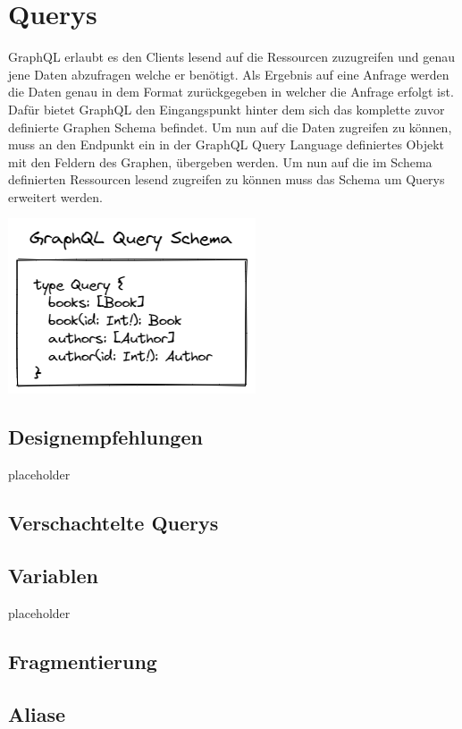 \documentclass[bachelor, german ]{hgbthesis}
\begin{document}
\section{Querys}

GraphQL erlaubt es den Clients lesend auf die Ressourcen zuzugreifen und genau jene Daten abzufragen welche er benötigt.
Als Ergebnis auf eine Anfrage werden die Daten genau in dem Format zurückgegeben in welcher die Anfrage erfolgt ist.
Dafür bietet GraphQL den Eingangspunkt hinter dem sich das komplette zuvor definierte Graphen Schema befindet.
Um nun auf die Daten zugreifen zu können, muss an den Endpunkt ein in der GraphQL Query Language definiertes Objekt mit den Feldern des Graphen, übergeben werden.
Um nun auf die im Schema definierten Ressourcen lesend zugreifen zu können muss das Schema um Querys erweitert werden. 

\includegraphics{pics/GraphQL_Query_Schema.png}

\subsection{Designempfehlungen}

placeholder
\pagebreak

\subsection{Verschachtelte Querys}

\subsection{Variablen}

placeholder
\pagebreak

\subsection{Fragmentierung}

\subsection{Aliase}
\end{document}
